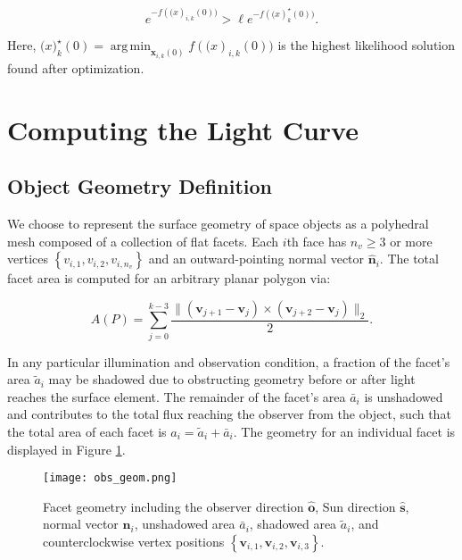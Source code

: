 \documentclass[a4paper,twocolumn]{spaceDebrisC} %
\newcommand{\vctr}[1]{\bm{#1}}
\newcommand{\unitv}[1]{\hat{\vctr{#1}}}
\newcommand{\figmed}[0]{0.4\textwidth}
\DeclareMathOperator*{\argmin}{arg\,min}
\begin{document}
\begin{equation}
  e^{-f(\vctr(x)_{i,k}(0))} > \ell e^{-f(\vctr(x)^\star_{k}(0))}.
\end{equation}

Here, $\vctr(x)^\star_{k}(0) = \argmin_{\vctr{x}_{i,k}(0)} f(\vctr(x)_{i,k}(0)) $ is the highest likelihood solution found after optimization.

\section{Computing the Light Curve}

\subsection{Object Geometry Definition}

We choose to represent the surface geometry of space objects as a polyhedral mesh composed of a collection of flat facets. Each $i$th face has $n_v \geq 3$ or more vertices $\left\{ v_{i,1}, v_{i,2}, v_{i,n_v} \right\}$ and an outward-pointing normal vector $\unitv{n}_i$. The total facet area is computed for an arbitrary planar polygon via:

\begin{equation} \label{eq:poly_area}
 A(P) = \sum_{j=0}^{k-3} \frac{\| \left( \vctr{v}_{j+1} - \vctr{v}_{j} \right) \times \left( \vctr{v}_{j+2} - \vctr{v}_{j} \right)\|_2}{2}.
 \end{equation} 
 
 In any particular illumination and observation condition, a fraction of the facet's area $\tilde{a}_i$ may be shadowed due to obstructing geometry before or after light reaches the surface element. The remainder of the facet's area $\bar{a}_i$ is unshadowed and contributes to the total flux reaching the observer from the object, such that the total area of each facet is $a_i = \tilde{a}_i + \bar{a}_i$. The geometry for an individual facet is displayed in Figure \ref{fig:facet_geom}.

\begin{figure}[H]
  \centering
  \texttt{[image: obs\_geom.png]}
  \caption{Facet geometry including the observer direction $\unitv{o}$, Sun direction $\unitv{s}$, normal vector $\unitv{n}_i$, unshadowed area $\bar{a}_i$, shadowed area $\tilde{a}_i$, and counterclockwise vertex positions $\left\{ \vctr{v}_{i,1}, \vctr{v}_{i,2}, \vctr{v}_{i,3} \right\}$.}
  \label{fig:facet_geom}
\end{figure}
\end{document}
